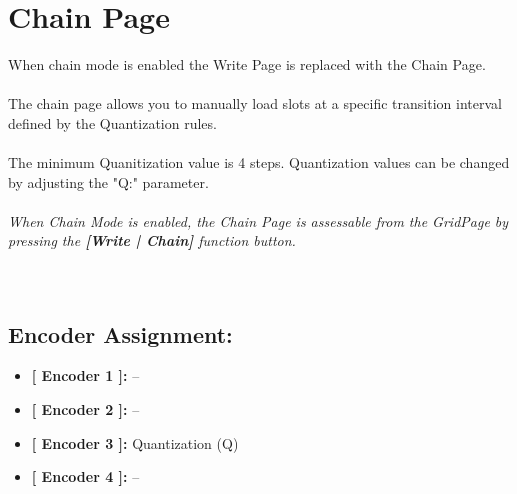 \chapter{Chain Page}
When chain mode is enabled the Write Page is replaced with the Chain Page.\\
\\
The chain page allows you to manually load slots at a specific transition interval defined by the Quantization rules.\\
\\
The minimum Quanitization value is 4 steps. Quantization values can be changed by adjusting the "Q:" parameter.
\\\\
\textit{When Chain Mode is enabled, the Chain Page is assessable from the GridPage by pressing the  \textbf{[Write | Chain]} function button.}
\\\\
\\
\section{Encoder Assignment:}

\begin{itemize}
	\item \textbf{[ Encoder 1 ]: } --
	\item \textbf{[ Encoder 2 ]: } --
	\item \textbf{[ Encoder 3 ]: } Quantization (Q)
	\item \textbf{[ Encoder 4 ]: }--
\end{itemize}
